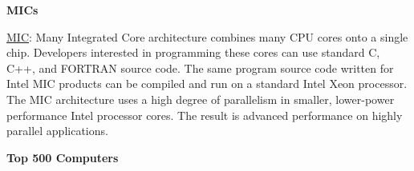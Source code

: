 \documentclass[12pt]{article}
\begin{document}
\vspace*{2em}
\noindent \textbf{MICs}

\underline{MIC}: Many Integrated Core architecture  combines many CPU cores onto a single chip. Developers interested in programming these cores can use standard C, C++, and FORTRAN source code. The same program source code written for Intel MIC products can be compiled and run on a standard Intel Xeon processor. The MIC architecture uses a high degree of parallelism in smaller, lower-power performance Intel processor cores. The result is advanced performance on highly parallel applications.

\vspace*{2em}
\noindent \textbf{Top 500 Computers}
\end{document}

